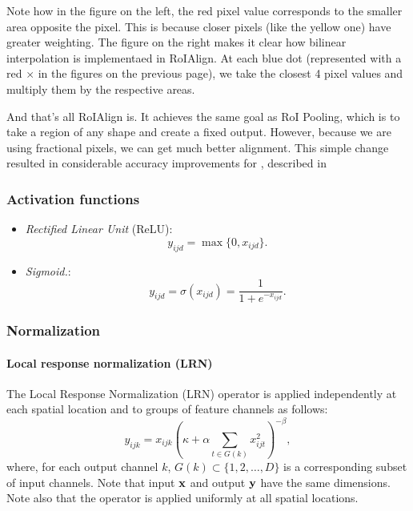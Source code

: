 Note how in the figure on the left, the red pixel value corresponds to the smaller area opposite the pixel. This is because closer pixels (like the yellow one) have greater weighting.
The figure on the right makes it clear how bilinear interpolation is implementaed in RoIAlign. At each blue dot (represented with a red $\times$ in the figures on the previous page), we take the closest 4 pixel values and multiply them by the respective areas.

And that's all RoIAlign is. It achieves the same goal as RoI Pooling, which is to take a region of any shape and create a fixed output. However, because we are using fractional pixels, we can get much better alignment. This simple change resulted in considerable accuracy improvements for \maskrcnn, described in 

\subsubsection{Activation functions}\label{s:activation}

%
\begin{itemize}
	\item \emph{Rectified Linear Unit} (ReLU):
	\[
	y_{ijd} = \max\{0, x_{ijd}\}.
	\]
	
	\item \emph{Sigmoid.}:
	\[
	y_{ijd} = \sigma(x_{ijd}) = \frac{1}{1+e^{-x_{ijd}}}.
	\]
\end{itemize}
%



\subsubsection{Normalization}\label{s:normalization}

\paragraph{Local response normalization (LRN)}\label{s:ccnormalization}

The Local Response Normalization (LRN) operator is applied independently at each spatial location and to groups of feature channels as follows:
\[
y_{ijk} = x_{ijk} \left( \kappa + \alpha \sum_{t\in G(k)} x_{ijt}^2 \right)^{-\beta},
\]
where, for each output channel $k$, $G(k) \subset \{1, 2, \dots, D\}$ is a corresponding subset of input channels. Note that input $\mathbf{x}$ and output $\mathbf{y}$ have the same dimensions. Note also that the operator is applied uniformly at all spatial locations.


